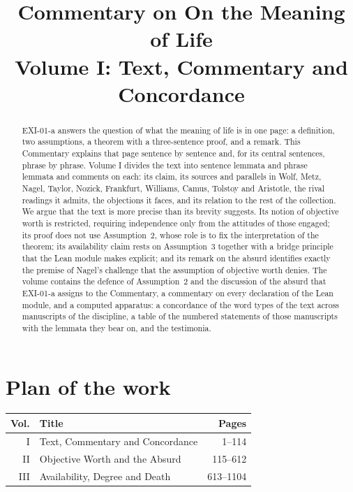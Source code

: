 \documentclass{situationist-preprint}
\title{Commentary on On the Meaning of Life\\[0.4em]\large Volume I: Text, Commentary and Concordance}
\begin{document}
\maketitle

\begin{abstract}
EXI-01-a answers the question of what the meaning of life is in one page: a definition, two assumptions, a theorem with a three-sentence proof, and a remark. This Commentary explains that page sentence by sentence and, for its central sentences, phrase by phrase. Volume I divides the text into \cnSentLemmata{} sentence lemmata and \cnPhraseLemmata{} phrase lemmata and comments on each: its claim, its sources and parallels in Wolf, Metz, Nagel, Taylor, Nozick, Frankfurt, Williams, Camus, Tolstoy and Aristotle, the rival readings it admits, the objections it faces, and its relation to the rest of the collection. We argue that the text is more precise than its brevity suggests. Its notion of objective worth is restricted, requiring independence only from the attitudes of those engaged; its proof does not use Assumption~2, whose role is to fix the interpretation of the theorem; its availability claim rests on Assumption~3 together with a bridge principle that the Lean module makes explicit; and its remark on the absurd identifies exactly the premise of Nagel's challenge that the assumption of objective worth denies. The volume contains the defence of Assumption~2 and the discussion of the absurd that EXI-01-a assigns to the Commentary, a commentary on every declaration of the Lean module, and a computed apparatus: a concordance of the \cnTypes{} word types of the text across \cnOtherMss{} manuscripts of the discipline, a table of the \cnStatements{} numbered statements of those manuscripts with the lemmata they bear on, and the testimonia.
\end{abstract}

\section*{Plan of the work}

\begin{center}\small
\begin{tabular}{@{}rlr@{}}
\toprule
Vol. & Title & Pages \\
\midrule
I & Text, Commentary and Concordance & 1--114 \\
II & Objective Worth and the Absurd & 115--612 \\
III & Availability, Degree and Death & 613--1104 \\
\bottomrule
\end{tabular}
\end{center}















\appendix



\label{LastPageVolI}
\end{document}
